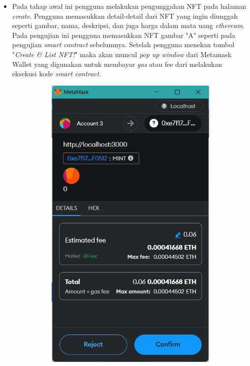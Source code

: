 \begin{itemize}
      \item Pada tahap awal ini pengguna melakukan pengunggahan NFT pada halaman \emph{create}. Pengguna memasukkan detail-detail dari NFT yang ingin diunggah seperti gambar, nama, deskripsi, dan juga harga dalam mata uang \emph{ethereum}. Pada pengujian ini pengguna memasukkan NFT gambar "A" seperti pada pengujian \emph{smart contract} sebelumnya. Setelah pengguna menekan tombol "\emph{Create \& List NFT!}" maka akan muncul \emph{pop up window} dari Metamask Wallet yang digunakan untuk membayar \emph{gas} atau fee dari melakukan eksekusi kode \emph{smart contract}. 
      
       \begin{figure} [H] \centering
      \centering
      \begin{subfigure}{0.45\textwidth}
          \includegraphics[scale=0.32]{gambar/confirm_create.jpg}

\end{subfigure}
\end{figure}
\end{itemize}
